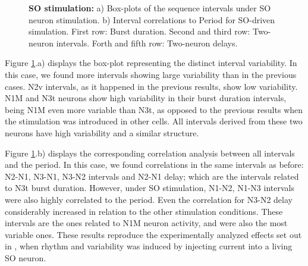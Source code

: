 \begin{figure}[hbt!]
\begin{minipage}[b]{0.53\textwidth}
\begin{minipage}[b]{\textwidth}
		\end{minipage}
	\end{minipage}
	\caption{\textbf{SO stimulation: }a) Box-plots of the sequence intervals under SO neuron stimulation. b) Interval correlations to Period for SO-driven simulation. First row: Burst duration. Second and third row: Two-neuron intervals. Forth and fifth row: Two-neuron delays.}
	\label{fig:invariant so}
\end{figure}


Figure \ref{fig:invariant so}.a) displays the box-plot representing the distinct interval variability. In this case, we found more intervals showing large variability than in the previous cases. N2v intervals, as it happened in the previous results, show low variability. %
N1M and N3t neurons show high variability in their burst duration intervals, being N1M even more variable than N3t, as opposed to the previous results when the stimulation was introduced in other cells. All intervals derived from these two neurons have high variability and a similar structure. %




Figure \ref{fig:invariant so}.b) displays the corresponding correlation analysis between all intervals and the period. %
In this case, we found correlations in the same intervals as before: N2-N1, N3-N1, N3-N2 intervals and N2-N1 delay; which are the intervals related to N3t burst duration. However, under SO stimulation,  N1-N2, N1-N3 intervals were also highly correlated to the period. Even the correlation for N3-N2 delay considerably increased in relation to the other stimulation conditions. These intervals are the ones related to N1M neuron activity, and were also the most variable ones.  These results reproduce the experimentally analyzed effects set out in \parencite{elliott_temporal_1991}, when rhythm and variability was induced by injecting current into a living SO neuron.

